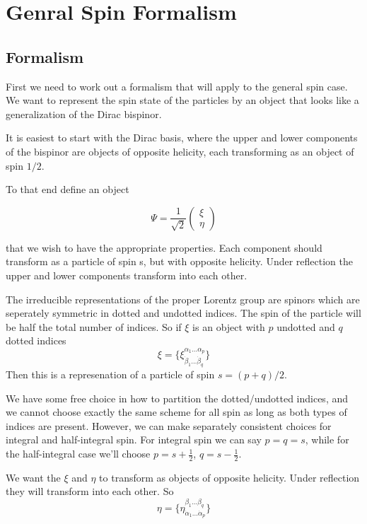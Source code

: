 
\section{Genral Spin Formalism}

\subsection{Formalism}
First we need to work out a formalism that will apply to the general spin case.  
We want to represent the spin state of the particles by an object that looks like a generalization of the Dirac bispinor.

It is easiest to start with the Dirac basis, where the upper and lower components of the bispinor are objects of opposite helicity, each transforming as an object of spin $1/2$.

To that end define an object

\[
\Psi  = \frac{1}{\sqrt{2}} \begin{pmatrix} \xi \\ \eta \end{pmatrix}
\]

that we wish to have the appropriate properties.  Each component should transform as a particle of spin s, but with opposite helicity.  Under reflection the upper and lower components transform into each other.

The irreducible representations of the proper Lorentz group are spinors which are seperately symmetric in dotted and undotted indices.  The spin of the particle will be half the total number of indices.  So if $\xi$ is an object with $p$ undotted and $q$ dotted indices
\[
	\xi = \{ \xi^{\alpha_1 \ldots \alpha_p}_{\dot\beta_1 \ldots \dot\beta_q} \}
\]
Then this is a represenation of a particle of spin $s = (p+q)/2$.

We have some free choice in how to partition the dotted/undotted indices, and we cannot choose exactly the same scheme for all spin as long as both types of indices are present.  However, we can make separately consistent choices for integral and half-integral spin.  For integral spin we can say $p=q=s$, while for the half-integral case we'll choose $p=s+\frac{1}{2}$, $q=s-\frac{1}{2}$.




We want the $\xi$ and $\eta$ to transform as objects of opposite helicity.  Under reflection they will transform into each other.  So 
 \[
	\eta = \{ \eta_{\dot \alpha_1 \ldots \dot \alpha_p}^{\beta_1 \ldots \beta_q} \}
\] 




